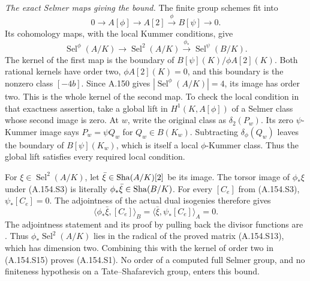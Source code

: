 \emph{The exact Selmer maps giving the bound.}
The finite group schemes fit into
\[
 0\longrightarrow A[\phi]\longrightarrow A[2]
       \xrightarrow{\phi}B[\psi]\longrightarrow0.
\tag{A.154.S14}
\]
Its cohomology maps, with the local Kummer
conditions, give
\[
 \operatorname{Sel}^{\phi}(A/K)
       \longrightarrow\operatorname{Sel}^{2}(A/K)
       \xrightarrow{\phi_*}\operatorname{Sel}^{\psi}(B/K).
\tag{A.154.S15}
\]
The kernel of the first map is the boundary
of \(B[\psi](K)/\phi A[2](K)\).
Both rational kernels have order two,
\(\phi A[2](K)=0\), and this boundary is
the nonzero class \([-4b]\).
Since A.150 gives
\(|\operatorname{Sel}^{\phi}(A/K)|=4\),
its image has order two.
This is the whole kernel of the second
map.  To check the local condition in
that exactness assertion, take a global
lift in \(H^1(K,A[\phi])\) of a Selmer
class whose second image is zero.
At \(w\), write the original class
as \(\delta_2(P_w)\).
Its zero \(\psi\)-Kummer image says
\(P_w=\psi Q_w\) for \(Q_w\in B(K_w)\).
Subtracting \(\delta_\phi(Q_w)\) leaves
the boundary of \(B[\psi](K_w)\), which
is itself a local \(\phi\)-Kummer class.
Thus the global lift satisfies every
required local condition.

For \(\xi\in\operatorname{Sel}^{2}(A/K)\),
let \(\bar\xi\in\operatorname{Sha}(A/K)[2]\) be its
image.  The torsor image of \(\phi_*\xi\)
under (A.154.S3) is literally
\(\phi_*\bar\xi\in\operatorname{Sha}(B/K)\).
For every \([C_e]\) from (A.154.S3),
\(\psi_*[C_e]=0\).  The adjointness of
the actual dual isogenies therefore gives
\[
 \langle\phi_*\bar\xi,[C_e]\rangle_B
       =\langle\bar\xi,\psi_*[C_e]\rangle_A=0.
\tag{A.154.S16}
\]
The adjointness statement and its proof
by pulling back the divisor functions are
\cite[Theorem 1.2 and Section 2, pp.\ 187--188]
{AgentCasselsIsogenies1965}.
Thus \(\phi_*\operatorname{Sel}^{2}(A/K)\)
lies in the radical of the proved matrix
(A.154.S13), which has dimension two.
Combining this with the kernel of order
two in (A.154.S15) proves (A.154.S1).
No order of a computed full Selmer group,
and no finiteness hypothesis on a
Tate--Shafarevich group, enters this bound.

